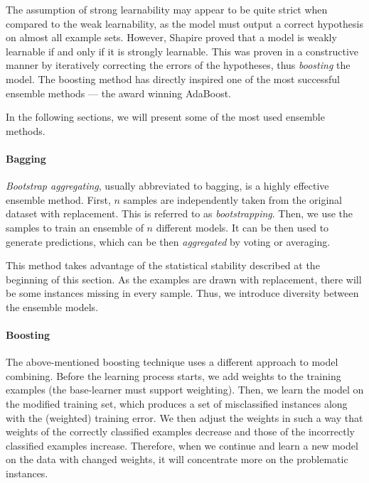 The assumption of strong learnability may appear to be quite strict when 
compared to the weak learnability, as the model must output a correct 
hypothesis on almost all example sets. However, Shapire proved that a model 
is weakly learnable if and only if it is strongly learnable. 
\citep{Schapire:1990:SWL:83637.83645} This was proven in a constructive manner
by iteratively correcting the errors of the hypotheses, thus \emph{boosting} 
the model. The boosting method has directly inspired one of the most successful
ensemble methods --- the award winning AdaBoost.
\cite{Freund:1996:ENB:3091696.3091715, Freund:1997:DGO:261540.261549}

In the following sections, we will present some of the most used ensemble 
methods.
\paragraph{Bagging} \label{bagging}
\emph{Bootstrap aggregating}, usually abbreviated to bagging, is a highly
effective ensemble method. First, $n$ samples are independently taken from 
the original dataset with replacement. This is referred to as 
\emph{bootstrapping}. Then, we use the samples to train an ensemble of $n$
different models. It can be then used to generate predictions, which can be
then \emph{aggregated} by voting or averaging.

This method takes advantage of the statistical stability described at the
beginning of this section. As the examples are drawn with replacement, there
will be some instances missing in every sample. Thus, we introduce diversity
between the ensemble models. \citep[331]{Flach:2012:MLA:2490546}

\paragraph{Boosting} \label{boosting}
The above-mentioned boosting technique uses a different approach to model
combining. Before the learning process starts, we add weights to the training 
examples (the base-learner must support weighting). Then, we learn the model
on the modified training set, which produces a set of misclassified instances
along with the (weighted) training error. We then adjust the weights in such a
way that weights of the correctly classified examples decrease and those of
the incorrectly classified examples increase. Therefore, when we continue and
learn a new model on the data with changed weights, it will concentrate more 
on the problematic instances.


